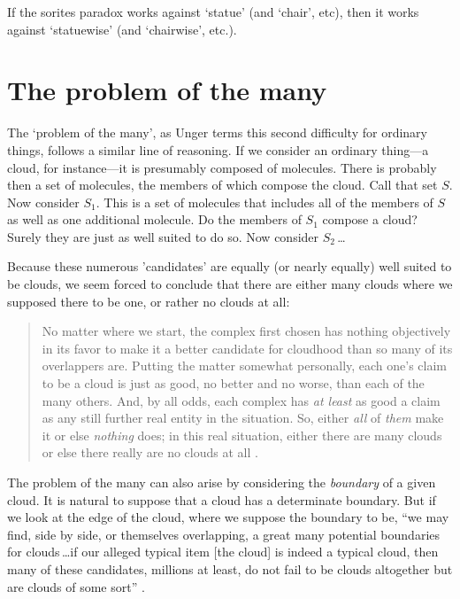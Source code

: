 \documentclass[11pt]{article}
\newenvironment{squote}{%
	\begin{quote}\begin{singlespace}%
	}{%
	\end{singlespace}\end{quote}}
\begin{document}
\begin{spacing}{1.5}
If the sorites paradox works against `statue' (and `chair', etc), then
it works against `statuewise' (and `chairwise', etc.).

\section{The problem of the many}
\label{many}
The `problem of the many', as Unger terms this second difficulty for
ordinary things, follows a similar line of reasoning.  If we consider
an ordinary thing---a cloud, for instance---it is presumably composed
of molecules.  There is probably then a set of molecules, the members
of which compose the cloud.  Call that set $S$.  Now consider $S_1$.
This is a set of molecules that includes all of the members of $S$ as
well as one additional molecule.  Do the members of $S_1$ compose a
cloud?  Surely they are just as well suited to do so.  Now consider
$S_2$\,\ldots

Because these numerous 'candidates' are equally (or nearly equally)
well suited to be clouds, we seem forced to conclude that there are
either many clouds where we supposed there to be one, or rather no
clouds at all:

\begin{squote}
No matter where we start, the complex first chosen has nothing
objectively in its favor to make it a better candidate for cloudhood
than so many of its overlappers are.  Putting the matter somewhat
personally, each one's claim to be a cloud is just as good, no better
and no worse, than each of the many others.  And, by all odds, each
complex has \emph{at least} as good a claim as any still further real
entity in the situation.  So, either \emph{all} of \emph{them} make it
or else \emph{nothing} does; in this real situation, either there are
many clouds or else there really are no clouds at all
\citep[415--??]{unger1980a}.
\end{squote}

The problem of the many can also arise by considering the {\em
  boundary} of a given cloud.  It is natural to suppose that a cloud
has a determinate boundary.  But if we look at the edge of the cloud,
where we suppose the boundary to be, ``we may find, side by side, or
themselves overlapping, a great many potential boundaries for
clouds\,\ldots if our alleged typical item {[}the cloud{]} is indeed
a typical cloud, then many of these candidates, millions at least, do
not fail to be clouds altogether but are clouds of some
sort'' \citep[420--421]{unger1980a}.


\end{spacing}
\end{document}
